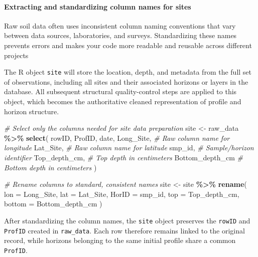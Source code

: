 \documentclass[
  10pt,
  b5paper,
  oneside]{book}
\newenvironment{Shaded}{\begin{snugshade}}{\end{snugshade}}
\newcommand{\AttributeTok}[1]{\textcolor[rgb]{0.13,0.29,0.53}{#1}}
\newcommand{\CommentTok}[1]{\textcolor[rgb]{0.56,0.35,0.01}{\textit{#1}}}
\newcommand{\FunctionTok}[1]{\textcolor[rgb]{0.13,0.29,0.53}{\textbf{#1}}}
\newcommand{\NormalTok}[1]{#1}
\newcommand{\OtherTok}[1]{\textcolor[rgb]{0.56,0.35,0.01}{#1}}
\newcommand{\SpecialCharTok}[1]{\textcolor[rgb]{0.81,0.36,0.00}{\textbf{#1}}}
\begin{document}
\paragraph{Extracting and standardizing column names for sites}\label{extracting-and-standardizing-column-names-for-sites}

Raw soil data often uses inconsistent column naming conventions that vary between data sources, laboratories, and surveys. Standardizing these names prevents errors and makes your code more readable and reusable across different projects

The R object \texttt{site} will store the location, depth, and metadata from the full set of observations, including all sites and their associated horizons or layers in the database. All subsequent structural quality-control steps are applied to this object, which becomes the authoritative cleaned representation of profile and horizon structure.

\begin{Shaded}
\begin{Highlighting}[]
\CommentTok{\# Select only the columns needed for site data preparation}
\NormalTok{site }\OtherTok{\textless{}{-}}\NormalTok{ raw\_data }\SpecialCharTok{\%\textgreater{}\%}
  \FunctionTok{select}\NormalTok{(}
\NormalTok{    rowID,}
\NormalTok{    ProfID,}
\NormalTok{    date,}
\NormalTok{    Long\_Site,              }\CommentTok{\# Raw column name for longitude}
\NormalTok{    Lat\_Site,               }\CommentTok{\# Raw column name for latitude}
\NormalTok{    smp\_id,                 }\CommentTok{\# Sample/horizon identifier}
\NormalTok{    Top\_depth\_cm,           }\CommentTok{\# Top depth in centimeters}
\NormalTok{    Bottom\_depth\_cm         }\CommentTok{\# Bottom depth in centimeters}
\NormalTok{  )}

  \CommentTok{\# Rename columns to standard, consistent names}
\NormalTok{site }\OtherTok{\textless{}{-}}\NormalTok{ site }\SpecialCharTok{\%\textgreater{}\%}
  \FunctionTok{rename}\NormalTok{(}
    \AttributeTok{lon =}\NormalTok{ Long\_Site,}
    \AttributeTok{lat =}\NormalTok{ Lat\_Site,}
    \AttributeTok{HorID =}\NormalTok{ smp\_id,}
    \AttributeTok{top =}\NormalTok{ Top\_depth\_cm,}
    \AttributeTok{bottom =}\NormalTok{ Bottom\_depth\_cm}
\NormalTok{  ) }
\end{Highlighting}
\end{Shaded}

After standardizing the column names, the \texttt{site} object preserves the \texttt{rowID} and \texttt{ProfID} created in \texttt{raw\_data}. Each row therefore remains linked to the original record, while horizons belonging to the same initial profile share a common \texttt{ProfID}.
\end{document}
